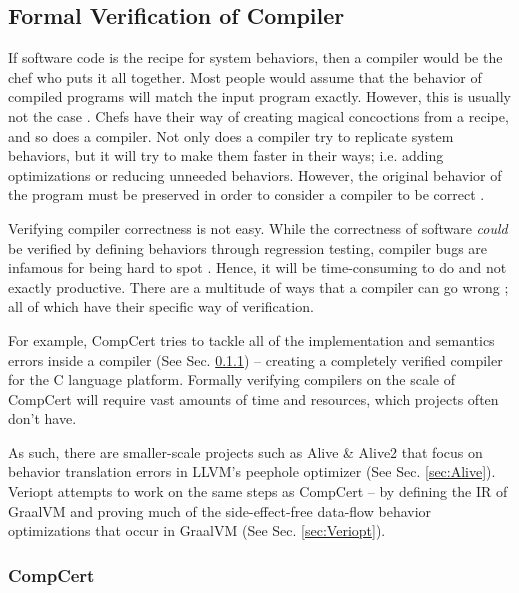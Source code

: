 \subsection{Formal Verification of Compiler}
\label{sec:verification}

If software code is the recipe for system behaviors, then a compiler would be the chef who puts it all together. Most people would assume that 
the behavior of compiled programs will match the input program exactly. However, this is usually not the case \cite{compcertVerification}. 
Chefs have their way of creating magical concoctions from a recipe, and so does a compiler. Not only does a compiler try to replicate 
system behaviors, but it will try to make them faster in their ways; i.e. adding optimizations or reducing unneeded behaviors. However, the 
original behavior of the program must be preserved in order to consider a compiler to be correct 
\cite{compcertVerification,AliveInLean,Alive2,Term_Graph_Optimizations}.

Verifying compiler correctness is not easy. While the correctness of software \emph{could} be verified by defining behaviors through 
regression testing, compiler bugs are infamous for being hard to spot \cite{testing, compcertVerification}. Hence, it will be time-consuming to 
do and not exactly productive. There are a multitude of ways that a compiler can go wrong \cite[Sec. 1.2]{CompilerOptimization}; 
all of which have their specific way of verification. 

For example, CompCert \cite{compcertVerification} tries to tackle all of the implementation and semantics errors inside a compiler 
(See Sec. \ref{sec:CompCert}) -- creating a completely verified compiler for the C language platform. Formally verifying compilers on the scale of 
CompCert will require vast amounts of time and resources, which projects often don't have.

As such, there are smaller-scale projects such as Alive \cite{AliveInLean} \& Alive2 \cite{Alive2} that focus on behavior translation errors 
in LLVM's peephole optimizer (See Sec. \ref{sec:Alive}). Veriopt attempts to work on the same steps as CompCert -- by defining the IR of GraalVM and 
proving much of the side-effect-free data-flow behavior optimizations that occur in GraalVM 
\cite{ATVA21_GraalVM_IR_Semantics,Term_Graph_Optimizations} (See Sec. \ref{sec:Veriopt}).

\subsubsection{CompCert}
\label{sec:CompCert}

